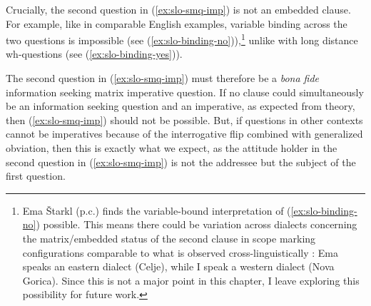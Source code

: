 \documentclass[output=paper,colorlinks,citecolor=brown]{langscibook}
\begin{document}
\noindent Crucially, the second question in (\ref{ex:slo-smq-imp}) is not an embedded clause. For example, like in comparable English examples, variable binding across the two questions is impossible (see (\ref{ex:slo-binding-no})),\footnote{Ema \v{S}tarkl (p.c.) finds the variable-bound interpretation of (\ref{ex:slo-binding-no}) possible. This means there could be variation across dialects concerning the matrix/embedded status of the second clause in scope marking configurations comparable to what is observed cross-linguistically \citep[][]{dayal93,dayal00}: Ema speaks an eastern dialect (Celje), while I speak a western dialect (Nova Gorica). Since this is not a major point in this chapter, I leave exploring this possibility for future work.} unlike with long distance wh-questions (see (\ref{ex:slo-binding-yes})).

\ea {}
\z\z

\noindent The second question in (\ref{ex:slo-smq-imp}) must therefore be a \textit{bona fide} information seeking matrix imperative question. If no clause could simultaneously be an information seeking question and an imperative, as expected from  theory, then (\ref{ex:slo-smq-imp}) should not be possible. But, if questions in other contexts cannot be imperatives because of the interrogative flip combined with generalized obviation, then this is exactly what we expect, as the attitude holder in the second question in (\ref{ex:slo-smq-imp}) is not the addressee but the subject of the first question. 
\end{document}
